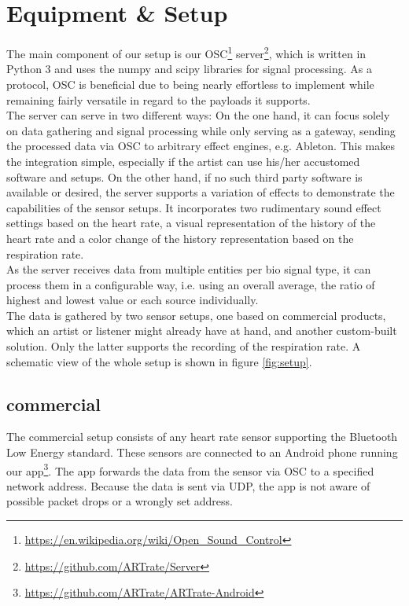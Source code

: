 \documentclass{sigchi-ext}
\begin{document}
\section{Equipment \& Setup}

The main component of our setup is our OSC\footnote{\url{https://en.wikipedia.org/wiki/Open_Sound_Control}}
server\footnote{\url{https://github.com/ARTrate/Server}}, which is written in Python 3 and uses the numpy and
scipy libraries for signal processing. As a protocol, OSC is beneficial due to being nearly effortless
to implement while remaining fairly versatile in regard to the payloads it supports. \\
The server can serve in two different ways: On the one hand, it can focus solely on data gathering and signal 
processing while only serving as a gateway, sending the processed data via OSC to arbitrary effect
engines, e.g. Ableton. This makes the integration simple, especially if the artist can use his/her accustomed
software and setups. On the other hand, if no such third party software is available or desired, the server supports a
variation of effects to demonstrate the capabilities of the sensor setups. It incorporates two rudimentary
sound effect settings based on the heart rate, a visual representation of the history of the heart rate
and a color change of the history representation based on the respiration rate.\\
As the server receives data from multiple entities per bio signal type, it can process them in a 
configurable way, i.e. using an overall average, the ratio of highest and lowest value or each source
individually. \\
The data is gathered by two sensor setups, one based on commercial products, which an artist or
listener might already have at hand, and another custom-built solution. Only the latter supports
the recording of the respiration rate. A schematic view of the whole setup is shown in figure \ref{fig:setup}.

\subsection{commercial}

The commercial setup consists of any heart rate sensor supporting the Bluetooth Low Energy
standard. These sensors are connected to an Android phone running our app\footnote{\url{https://github.com/ARTrate/ARTrate-Android}}.
The app forwards the data from the sensor via OSC to a specified network address.
Because the data is sent via UDP, the app is not aware of possible packet drops or a wrongly set address.
\end{document}
